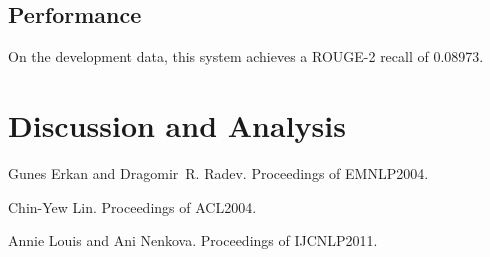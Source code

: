 \documentclass[11pt,letterpaper]{article}
\begin{document}
\subsection{Performance}
On the development data, this system achieves a ROUGE-2 recall of 0.08973.

\section{Discussion and Analysis}


\begin{thebibliography}{}

Gunes Erkan and Dragomir~R. Radev.
\newblock Proceedings of EMNLP2004.

Chin-Yew Lin.
\newblock Proceedings of ACL2004.

Annie Louis and Ani Nenkova.
\newblock Proceedings of IJCNLP2011.

\end{thebibliography}
\end{document}
